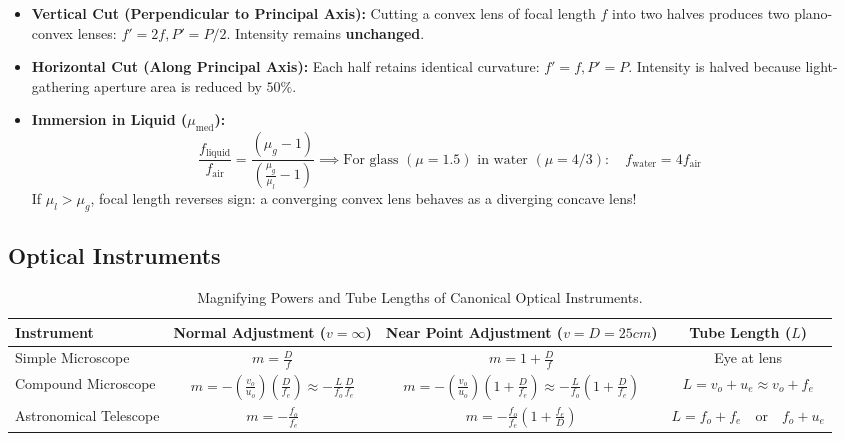 \documentclass[11pt,a4paper]{article}
\begin{document}
\begin{usecasebox}
\begin{itemize}
  \item \textbf{Vertical Cut (Perpendicular to Principal Axis):} Cutting a convex lens of focal length $f$ into two halves produces two plano-convex lenses: $f' = 2f, P' = P/2$. Intensity remains \textbf{unchanged}.
  \item \textbf{Horizontal Cut (Along Principal Axis):} Each half retains identical curvature: $f' = f, P' = P$. Intensity is halved because light-gathering aperture area is reduced by $50\%$.
  \item \textbf{Immersion in Liquid ($\mu_{\text{med}}$):}
  \begin{equation*}
    \frac{f_{\text{liquid}}}{f_{\text{air}}} = \frac{(\mu_g - 1)}{\left(\frac{\mu_g}{\mu_l} - 1\right)} \implies \text{For glass } (\mu=1.5) \text{ in water } (\mu=4/3): \quad f_{\text{water}} = 4 f_{\text{air}}
  \end{equation*}
  If $\mu_l > \mu_g$, focal length reverses sign: a converging convex lens behaves as a diverging concave lens!
\end{itemize}
\end{usecasebox}

\subsection{Optical Instruments}

\begin{table}[htbp]
\centering
\small
\renewcommand{\arraystretch}{1.2}
\begin{tabularx}{\textwidth}{L c c c}
\toprule
\textbf{Instrument} & \textbf{Normal Adjustment ($v = \infty$)} & \textbf{Near Point Adjustment ($v = D = 25\si{cm}$)} & \textbf{Tube Length ($L$)} \\
\midrule
Simple Microscope & $m = \frac{D}{f}$ & $m = 1 + \frac{D}{f}$ & Eye at lens \\
Compound Microscope & $m = -\left(\frac{v_o}{u_o}\right)\left(\frac{D}{f_e}\right) \approx -\frac{L}{f_o}\frac{D}{f_e}$ & $m = -\left(\frac{v_o}{u_o}\right)\left(1 + \frac{D}{f_e}\right) \approx -\frac{L}{f_o}\left(1 + \frac{D}{f_e}\right)$ & $L = v_o + u_e \approx v_o + f_e$ \\
Astronomical Telescope & $m = -\frac{f_o}{f_e}$ & $m = -\frac{f_o}{f_e}\left(1 + \frac{f_e}{D}\right)$ & $L = f_o + f_e \quad \text{or} \quad f_o + u_e$ \\
\bottomrule
\end{tabularx}
\caption{Magnifying Powers and Tube Lengths of Canonical Optical Instruments.}
\end{table}
\end{document}
